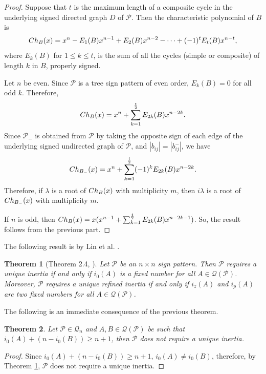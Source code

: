 \documentclass[10pt,a4paper]{amsart}
\newtheorem{theorem}{Theorem}[section]
\numberwithin{equation}{section}
\def\Ch{{\rm Ch}}
\begin{document}
	\begin{proof}
		Suppose that $t$ is the maximum length of a composite cycle in the underlying signed directed graph $D$ of $\mathcal{P}$. Then the characteristic polynomial of $B$ is $$\Ch_B(x)=x^n-E_1(B)x^{n-1}+E_2(B)x^{n-2}-\cdots+(-1)^tE_t(B)x^{n-t},$$ where $E_k(B)$ for $1\leq k\leq t$, is the sum of all the cycles (simple or composite) of length $k$ in $B$, properly signed. 
		
		Let $n$ be even. Since $\mathcal{P}$ is a tree sign pattern of even order, $E_k(B)=0$ for all odd $k$. Therefore, $$\Ch_B(x)=x^n+\sum_{k=1}^{\frac{t}{2}}E_{2k}(B)x^{n-2k}.$$
		Since $\mathcal{P}_-$ is obtained from $\mathcal{P}$ by taking the opposite sign of each edge of the underlying signed undirected graph of $\mathcal{P}$, and $|b_{ij}|=|b_{ij}^-|$, we have 
		$$\Ch_{B_-}(x)=x^n+\sum_{k=1}^{\frac{t}{2}}(-1)^kE_{2k}(B)x^{n-2k}.$$
		Therefore, if $\lambda$ is a root of $\Ch_B(x)$ with multiplicity $m$, then $i\lambda$ is a root of $\Ch_{B_-}(x)$ with multiplicity $m$.
		
		If $n$ is odd, then $\Ch_B(x) = x(x^{n-1}+\sum_{k=1}^{\frac{t}{2}}E_{2k}(B)x^{n-2k-1})$. So, the result follows from the previous part.
	\end{proof}
	
	
	
	The following result is by Lin et al. \cite{2018}.
	
	
	\begin{theorem} [Theorem 2.4, \cite{2018}]\label{th4}
		Let $\mathcal{P}$ be an $n \times n$ sign pattern. Then $\mathcal{P}$ requires a unique inertia if and only if $i_0(A)$ is a fixed number for all $A \in \mathcal{Q}(\mathcal{P})$. Moreover, $\mathcal{P}$ requires a unique refined inertia if and only if $i_z(A)$ and $i_p(A)$ are two fixed numbers for all $A \in \mathcal{Q}(\mathcal{P})$.
	\end{theorem}
	
	The following is an immediate consequence of the previous theorem.
	\begin{theorem}\label{lem2}
		Let $\mathcal{P}\in \mathcal{Q}_n$ and $A,B\in \mathcal{Q}(\mathcal{P})$ be such that $i_0(A)+(n-i_0(B))\geq n+1$, then $\mathcal{P}$ does not require a unique inertia. 
	\end{theorem}
	\begin{proof}
		Since $i_0(A)+(n-i_0(B))\geq n+1$, $i_0(A)\neq i_0(B)$, therefore, by Theorem \ref{th4}, $\mathcal{P}$ does not require a unique inertia.
	\end{proof}
	
\end{document}
